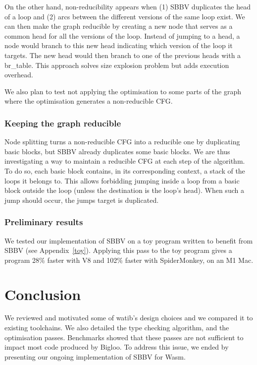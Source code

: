 \documentclass[a4paper,11pt]{article}
\renewcommand{\baselinestretch}{1.06}
\begin{document}
On the other hand, non-reducibility appears when (1) SBBV duplicates the head of
a loop and (2) arcs between the different versions of the same loop exist. We
can then make the graph reducible by creating a new node that serves as a common
head for all the versions of the loop. Instead of jumping to a head, a node
would branch to this new head indicating which version of the loop it targets.
The new head would then branch to one of the previous heads with a
\textsf{br\_table}. This approach solves size explosion problem but adds
execution overhead.

We also plan to test not applying the optimisation to some parts of the graph
where the optimisation generates a non-reducible CFG\@.

\subsubsection{Keeping the graph reducible}
Node splitting turns a non-reducible CFG into a reducible one by duplicating
basic blocks, but SBBV already duplicates some basic blocks. We are thus
investigating a way to maintain a reducible CFG at each step of the algorithm.
To do so, each basic block contains, in its corresponding context, a stack of
the loops it belongs to. This allows forbidding jumping inside a loop from a
basic block outside the loop (unless the destination is the loop's head). When
such a jump should occur, the jumps target is duplicated.

\subsubsection{Preliminary results}
We tested our implementation of SBBV on a toy program written to benefit from
SBBV (see Appendix~\ref{toy}). Applying this pass to the toy program gives a
program 28\% faster with V8 and 102\% faster with SpiderMonkey, on an M1 Mac.

\section{Conclusion}
We reviewed and motivated some of \textsf{watib}'s design choices and we
compared it to existing toolchains. We also detailed the type checking
algorithm, and the optimisation passes. Benchmarks showed that these passes are
not sufficient to impact most code produced by Bigloo. To address this issue, we
ended by presenting our ongoing implementation of SBBV for Wasm.

\renewcommand{\baselinestretch}{1}
\printbibliography
\renewcommand{\baselinestretch}{1.05}
\end{document}
